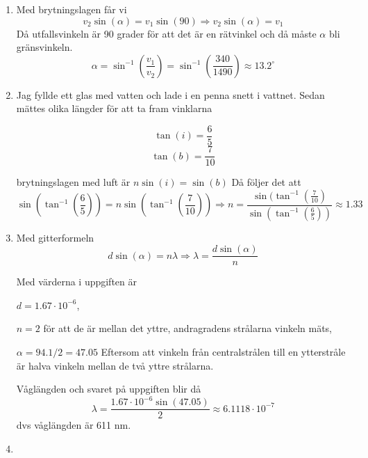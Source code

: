 \documentclass[a4paper,12pt]{article}
\begin{document}
\begin{enumerate}
    \item Med brytningslagen får vi
    $$v_2\sin(\alpha)=v_1\sin(90)\Rightarrow v_2\sin(\alpha)=v_1$$
    Då utfallsvinkeln är 90 grader för att det är en rätvinkel
    och då måste $\alpha$ bli gränsvinkeln. 
    $$\alpha = \sin^{-1}(\frac{v_1}{v_2})=\sin^{-1}(\frac{340}{1490})\approx 13.2^\circ$$

    \item Jag fyllde ett glas med vatten och lade i en penna snett i vattnet. 
    Sedan mättes olika längder för att ta fram vinklarna

    $$\tan(i)=\frac{6}{5}$$
    $$\tan(b)=\frac{7}{10}$$

    brytningslagen med luft är $n\sin(i)=\sin(b)$
    Då följer det att 
    $$\sin(\tan^{-1}(\frac{6}{5}))=n\sin(\tan^{-1}(\frac{7}{10}))\Rightarrow n=\frac{\sin(\tan^{-1}(\frac{7}{10})}{\sin(\tan^{-1}(\frac{6}{5}))}\approx 1.33$$

    \item Med gitterformeln 
    $$d\sin(\alpha)=n\lambda\Rightarrow \lambda=\frac{d\sin(\alpha)}{n}$$

    Med värderna i uppgiften är 
    
    $d=1.67\cdot 10^{-6}$,

    $n=2$ för att de är mellan det yttre, andragradens strålarna vinkeln mäts,
    
    $\alpha = 94.1/2 = 47.05$ Eftersom att vinkeln från centralstrålen till en ytterstråle är halva vinkeln
    mellan de två yttre strålarna.

    Våglängden och svaret på uppgiften blir då
    $$\lambda=\frac{1.67\cdot 10^{-6}{\sin(47.05)}}{2}\approx 6.1118\cdot 10^{-7}$$
    dvs våglängden är 611 nm.

    \item 


    
\end{enumerate}
\end{document}
